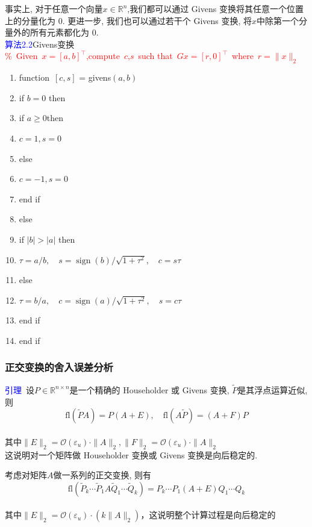 \documentclass[12pt,a4paper]{article}
\begin{document}
事实上, 对于任意一个向量$x \in \mathbb{R}^n$,我们都可以通过 Givens 变换将其任意一个位置上的分量化为 0. 更进一步, 我们也可以通过若干个 Givens 变换, 将$x$中除第一个分量外的所有元素都化为 0.\\

\noindent \textcolor{blue}{算法2.2}Givens变换\\
\textcolor{red}{\%~Given~$x=[a,b]^{\top}$,compute~$c$,$s$~such that~$Gx=[r,0]^{\top}$~where~$r=\|x\|_2$}
\begin{enumerate}[1:]
	\item function~$[c,s]$ = givens$(a,b)$
	\item if $b=0$ then
	\item \qquad if $a \ge 0$then
	\item \qquad \qquad $c=1,s=0$
	\item \qquad else
	\item \qquad \qquad $c=-1,s=0$
	\item \qquad end if
	\item else
	\item \qquad if $|b|>|a|$ then
	\item \qquad \qquad $\tau=a / b, \quad s=\operatorname{sign}(b) / \sqrt{1+\tau^{2}}, \quad c=s \tau$
	\item \qquad else
	\item \qquad \qquad $\tau=b / a, \quad c=\operatorname{sign}(a) / \sqrt{1+\tau^{2}}, \quad s=c \tau$
	\item \qquad end if
	\item end if  
\end{enumerate}

\noindent \subsubsection{正交变换的舍入误差分析}
\noindent \textcolor{blue}{引理}~设$P \in \mathbb{R}^{n \times n}$是一个精确的 Householder 或 Givens 变换, $\tilde P$是其浮点运算近似, 则$$
\mathrm{fl}(\tilde{P} A)=P(A+E), \quad \mathrm{fl}(A \tilde{P})=(A+F) P
$$\\
其中$\|E\|_{2}=\mathcal{O}\left(\varepsilon_{u}\right) \cdot\|A\|_{2},\|F\|_{2}=\mathcal{O}\left(\varepsilon_{u}\right) \cdot\|A\|_{2}$\\

\noindent 这说明对一个矩阵做 Householder 变换或 Givens 变换是向后稳定的.

考虑对矩阵$A$做一系列的正交变换, 则有$$
\mathrm{fl}\left(\tilde{P}_{k} \cdots \tilde{P}_{1} A \tilde{Q}_{1} \cdots \tilde{Q}_{k}\right)=P_{k} \cdots P_{1}(A+E) Q_{1} \cdots Q_{k}
$$\\其中$\|E\|_{2}=\mathcal{O}\left(\varepsilon_{u}\right) \cdot\left(k\|A\|_{2}\right)$，这说明整个计算过程是向后稳定的\\
\end{document}
